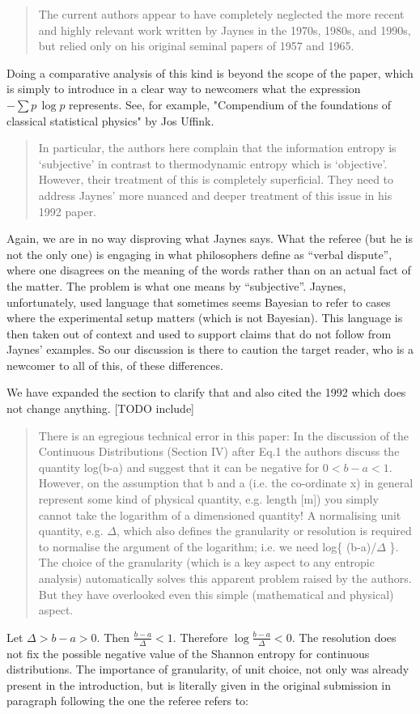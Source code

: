 \documentclass[11pt]{article}
\begin{document}
\begin{quote}
The current authors appear to have completely neglected the more recent and highly relevant work written by Jaynes in the 1970s, 1980s, and 1990s, but relied only on his original seminal papers of 1957 and 1965.
\end{quote}

Doing a comparative analysis of this kind is beyond the scope of the paper, which is simply to introduce in a clear way to newcomers what the expression $- \sum p \, \log p$ represents. See, for example, "Compendium of the foundations of classical statistical physics" by Jos Uffink.

\begin{quote}
In particular, the authors here complain that the information entropy is ‘subjective’ in contrast to thermodynamic entropy which is ‘objective’. However, their treatment of this is completely superficial. They need to address Jaynes’ more nuanced and deeper treatment of this issue in his 1992 paper.
\end{quote}
Again, we are in no way disproving what Jaynes says. What the referee (but he is not the only one) is engaging in what philosophers define as ``verbal dispute'', where one disagrees on the meaning of the words rather than on an actual fact of the matter. The problem is what one means by ``subjective''. Jaynes, unfortunately, used language that sometimes seems Bayesian to refer to cases where the experimental setup matters (which is not Bayesian). This language is then taken out of context and used to support claims that do not follow from Jaynes' examples. So our discussion is there to caution the target reader, who is a newcomer to all of this, of these differences.

We have expanded the section to clarify that and also cited the 1992 which does not change anything. [TODO include]


\begin{quote}
	There is an egregious technical error in this paper: In the discussion of the Continuous Distributions (Section IV) after Eq.1 the authors discuss the quantity log(b-a) and suggest that it can be negative for $0<b-a<1$. However, on the assumption that b and a (i.e. the co-ordinate x) in general represent some kind of physical quantity, e.g. length [m]) you simply cannot take the logarithm of a dimensioned quantity! A normalising unit quantity, e.g. $\Delta$, which also defines the granularity or resolution is required to normalise the argument of the logarithm; i.e. we need log\{ (b-a)/$\Delta$ \}. The choice of the granularity (which is a key aspect to any entropic analysis) automatically solves this apparent problem raised by the authors. But they have overlooked even this simple (mathematical and physical) aspect.
\end{quote}
Let $\Delta > b - a > 0$. Then $\frac{b-a}{\Delta} < 1$. Therefore $\log \frac{b-a}{\Delta} < 0$. The resolution does not fix the possible negative value of the Shannon entropy for continuous distributions. The importance of granularity, of unit choice, not only was already present in the introduction, but is literally given in the original submission in paragraph following the one the referee refers to:
\end{document}
